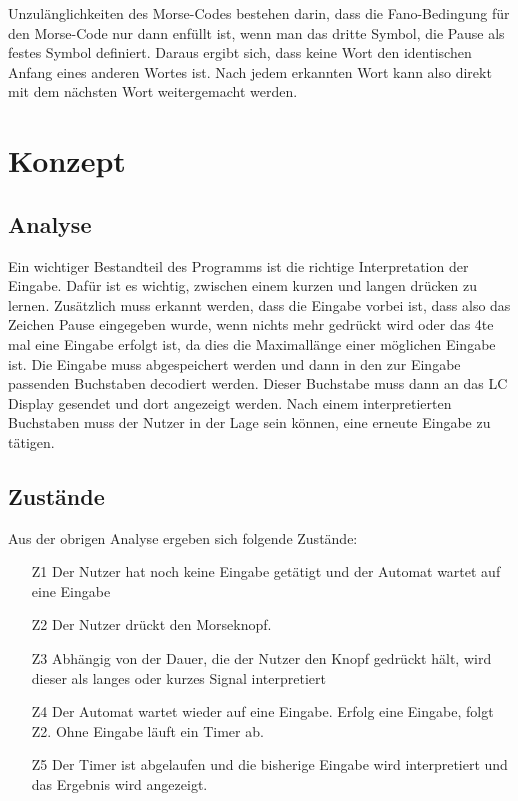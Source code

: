 \documentclass[a4paper,12pt]{article}
\begin{document}
	Unzulänglichkeiten des Morse-Codes bestehen darin, dass die Fano-Bedingung für den Morse-Code nur dann enfüllt ist, wenn man das dritte Symbol, die Pause als festes Symbol definiert. Daraus ergibt sich, dass keine Wort den identischen Anfang eines anderen Wortes ist. Nach jedem erkannten Wort kann also direkt mit dem nächsten Wort weitergemacht werden.
	
	\newpage 
	\section{Konzept}
	\subsection{Analyse}
	Ein wichtiger Bestandteil des Programms ist die richtige Interpretation der Eingabe. Dafür ist es wichtig, zwischen einem kurzen und langen drücken zu lernen. Zusätzlich muss erkannt werden, dass die Eingabe vorbei ist, dass also das Zeichen Pause eingegeben wurde, wenn nichts mehr gedrückt wird oder das 4te mal eine Eingabe erfolgt ist, da dies die Maximallänge einer möglichen Eingabe ist. Die Eingabe muss abgespeichert werden und dann in den zur Eingabe passenden Buchstaben decodiert werden. Dieser Buchstabe muss dann an das LC Display gesendet und dort angezeigt werden. Nach einem interpretierten Buchstaben muss der Nutzer in der Lage sein können, eine erneute Eingabe zu tätigen.\\
	\subsection{Zustände}
	Aus der obrigen Analyse ergeben sich folgende Zustände:
	\begin{enumerate}
		\item[Z1] Der Nutzer hat noch keine Eingabe getätigt und der Automat wartet auf eine Eingabe
		\item[Z2] Der Nutzer drückt den Morseknopf.
		\item[Z3] Abhängig von der Dauer, die der Nutzer den Knopf gedrückt hält, wird dieser als langes oder kurzes Signal interpretiert
		\item[Z4] Der Automat wartet wieder auf eine Eingabe. Erfolg eine Eingabe, folgt Z2. Ohne Eingabe läuft ein Timer ab.
		\item[Z5] Der Timer ist abgelaufen und die bisherige Eingabe wird interpretiert und das Ergebnis wird angezeigt.
	\end{enumerate}
\end{document}

